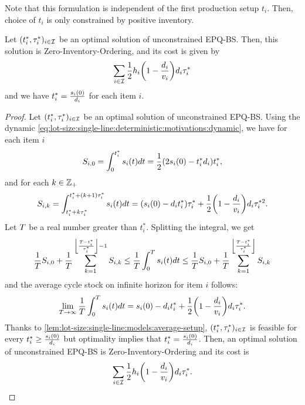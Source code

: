 Note that this formulation is independent of the first production setup $t_i$.
Then, choice of $t_i$ is only constrained by positive inventory.


\begin{lem}\label{lem:lot-size:single-line:models:ZIO}
Let $\bracket{t_i^*,\cover_i^*}_{i\in\REF}$ be an optimal solution of unconstrained EPQ-BS.
Then, this solution is Zero-Inventory-Ordering, and its cost is given by
\begin{equation}
  \sum_{i\in\REF}\frac{1}{2}\holding_i\bracket{1-\frac{\demand_i}{\rate_i}}\demand_i\cover_i^*
\end{equation}
and we have $t_i^*=\frac{s_i(0)}{d_i}$ for each item $i$.
\end{lem}


\begin{proof}
Let $\bracket{t_i^*,\cover_i^*}_{i\in\REF}$ be an optimal solution of unconstrained EPQ-BS.
Using the dynamic \eqref{eq:lot-size:single-line:deterministic:motivations:dynamic}, we have for each item $i$
\begin{equation}
  S_{i,0}
  =
  \int_0^{t_i^*}\inventory_i\bracket{t}dt
  = \frac{1}{2}\bracket{2\inventory_i\bracket{0}-t_i^*\demand_i}t_i^*,
\end{equation}
and for each $k\in\mathbb{Z}_+$
\begin{equation}
  S_{i,k}
  =
  \int_{t_i^*+k\cover_i^*}^{t_i^*+\bracket{k+1}\cover_i^*}\inventory_i(t)dt
  =
  \bracket{\inventory_i(0)-\demand_i t_i^*}\cover_i^*
  + \frac{1}{2}\bracket{1-\frac{\demand_i}{\rate_i}}\demand_i\cover_i^{*2}.
\end{equation}
Let $T$ be a real number greater than $t_i^*$.
Splitting the integral, we get
\begin{equation}
  \frac{1}{\horizon} S_{i,0}
  + \frac{1}{\horizon} \sum_{k=1}^{\left\lfloor\frac{\horizon-t_i^*}{\cover_i^*}\right\rfloor-1} S_{i,k}
  \le
  \frac{1}{\horizon} \int_0^{\horizon}\inventory_i\bracket{t}dt
  \le
  \frac{1}{\horizon} S_{i,0}
  + \frac{1}{\horizon} \sum_{k=1}^{\left\lfloor\frac{\horizon-t_i^*}{\cover_i^*}\right\rfloor} S_{i,k}
\end{equation}
and the average cycle stock on infinite horizon for item $i$ follows:
\begin{equation}
  \lim_{\horizon\rightarrow\infty} \frac{1}{\horizon} \int_0^{\horizon}\inventory_i\bracket{t}dt
  =
  \inventory_i(0)-\demand_i t_i^*
  + \frac{1}{2}\bracket{1-\frac{\demand_i}{\rate_i}}\demand_i\cover_i^*.
\end{equation}
Thanks to \cref{lem:lot-size:single-line:models:average-setup}, $\bracket{t_i^*,\cover_i^*}_{i\in\REF}$ is feasible for every $t_i^*\ge\frac{s_i(0)}{d_i}$ but optimality implies that $t_i^*=\frac{s_i(0)}{d_i}$.
Then, an optimal solution of unconstrained EPQ-BS is Zero-Inventory-Ordering and its cost is
\begin{equation}
  \sum_{i\in\REF}\frac{1}{2}\holding_i\bracket{1-\frac{\demand_i}{\rate_i}}\demand_i\cover_i^*.
\end{equation}
\end{proof}


